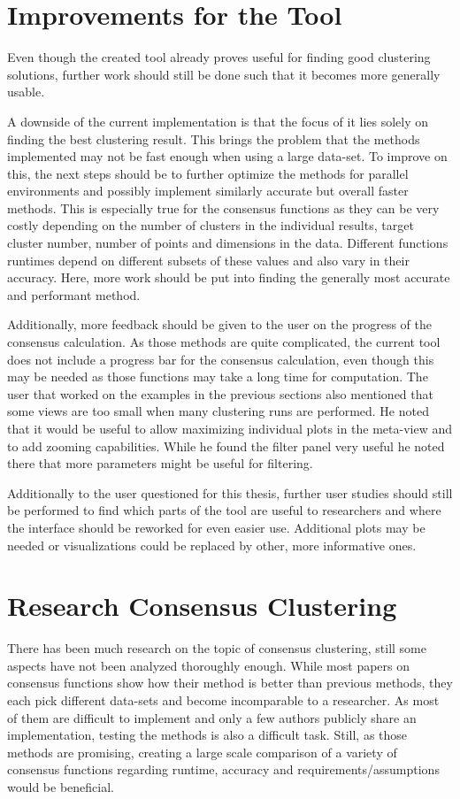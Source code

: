 \documentclass[
	a4paper,
	english,
	twoside,
	openright,               
	11pt                            
	]{report}
\begin{document}
\section{Improvements for the Tool}
Even though the created tool already proves useful for finding good clustering solutions, further work should still be done such that it becomes more generally usable. 

A downside of the current implementation is that the focus of it lies solely on finding the best clustering result. This brings the problem that the methods implemented may not be fast enough when using a large data-set. To improve on this, the next steps should be to further optimize the methods for parallel environments and possibly implement similarly accurate but overall faster methods. This is especially true for the consensus functions as they can be very costly depending on the number of clusters in the individual results, target cluster number, number of points and dimensions in the data. Different functions runtimes depend on different subsets of these values and also vary in their accuracy. Here, more work should be put into finding the generally most accurate and performant method.

Additionally, more feedback should be given to the user on the progress of the consensus calculation. As those methods are quite complicated, the current tool does not include a progress bar for the consensus calculation, even though this may be needed as those functions may take a long time for computation. The user that worked on the examples in the previous sections also mentioned that some views are too small when many clustering runs are performed. He noted that it would be useful to allow maximizing individual plots in the meta-view and to add zooming capabilities. While he found the filter panel very useful he noted there that more parameters might be useful for filtering.

Additionally to the user questioned for this thesis, further user studies should still be performed to find which parts of the tool are useful to researchers and where the interface should be reworked for even easier use. Additional plots may be needed or visualizations could be replaced by other, more informative ones.

\section{Research Consensus Clustering}
There has been much research on the topic of consensus clustering, still some aspects have not been analyzed thoroughly enough. While most papers on consensus functions show how their method is better than previous methods, they each pick different data-sets and become incomparable to a researcher. As most of them are difficult to implement and only a few authors publicly share an implementation, testing the methods is also a difficult task. Still, as those methods are promising, creating a large scale comparison of a variety of consensus functions regarding runtime, accuracy and requirements/assumptions would be beneficial.
\end{document}
